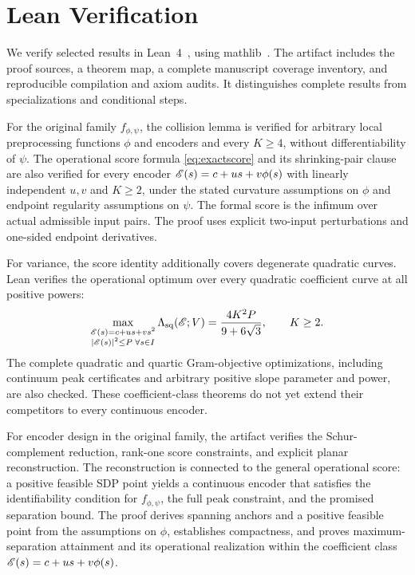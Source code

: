 \section{Lean Verification}\label{app:lean}

We verify selected results in Lean~4~\cite{lean4}, using mathlib~\cite{mathlib}. The artifact includes the proof sources, a theorem map, a complete manuscript coverage inventory, and reproducible compilation and axiom audits. It distinguishes complete results from specializations and conditional steps.

For the original family $f_{\phi,\psi}$, the collision lemma is verified for arbitrary local preprocessing functions $\phi$ and encoders and every $K\ge4$, without differentiability of $\psi$. The operational score formula \eqref{eq:exactscore} and its shrinking-pair clause are also verified for every encoder $\mathscr E(s)=c+us+v\phi(s)$ with linearly independent $u,v$ and $K\ge2$, under the stated curvature assumptions on $\phi$ and endpoint regularity assumptions on $\psi$. The formal score is the infimum over actual admissible input pairs. The proof uses explicit two-input perturbations and one-sided endpoint derivatives.

For variance, the score identity additionally covers degenerate quadratic curves. Lean verifies the operational optimum over every quadratic coefficient curve at all positive powers:
$$
 \max_{\substack{\mathscr E(s)=c+us+vs^2\\|\mathscr E(s)|^2\le P\;\forall s\in I}}
 \Lambda_{\mathrm{sq}}(\mathscr E;V)
 =\frac{4K^2P}{9+6\sqrt3},\qquad K\ge2.
$$
The complete quadratic and quartic Gram-objective optimizations, including continuum peak certificates and arbitrary positive slope parameter and power, are also checked. These coefficient-class theorems do not yet extend their competitors to every continuous encoder.

For encoder design in the original family, the artifact verifies the Schur-complement reduction, rank-one score constraints, and explicit planar reconstruction. The reconstruction is connected to the general operational score: a positive feasible SDP point yields a continuous encoder that satisfies the identifiability condition for $f_{\phi,\psi}$, the full peak constraint, and the promised separation bound. The proof derives spanning anchors and a positive feasible point from the assumptions on $\phi$, establishes compactness, and proves maximum-separation attainment and its operational realization within the coefficient class $\mathscr E(s)=c+us+v\phi(s)$.

